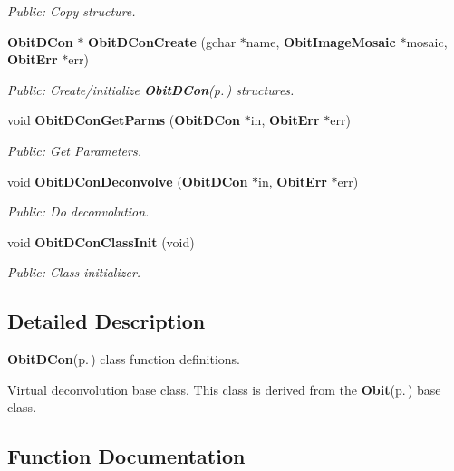 \begin{CompactItemize}
\begin{CompactList}\small\item\em Public: Copy structure. \item\end{CompactList}\item 
{\bf Obit\-DCon} $\ast$ {\bf Obit\-DCon\-Create} (gchar $\ast$name, {\bf Obit\-Image\-Mosaic} $\ast$mosaic, {\bf Obit\-Err} $\ast$err)
\begin{CompactList}\small\item\em Public: Create/initialize {\bf Obit\-DCon}{\rm (p.\,\pageref{structObitDCon})} structures. \item\end{CompactList}\item 
void {\bf Obit\-DCon\-Get\-Parms} ({\bf Obit\-DCon} $\ast$in, {\bf Obit\-Err} $\ast$err)
\begin{CompactList}\small\item\em Public: Get Parameters. \item\end{CompactList}\item 
void {\bf Obit\-DCon\-Deconvolve} ({\bf Obit\-DCon} $\ast$in, {\bf Obit\-Err} $\ast$err)
\begin{CompactList}\small\item\em Public: Do deconvolution. \item\end{CompactList}\item 
void {\bf Obit\-DCon\-Class\-Init} (void)
\begin{CompactList}\small\item\em Public: Class initializer. \item\end{CompactList}\end{CompactItemize}


\subsection{Detailed Description}
{\bf Obit\-DCon}{\rm (p.\,\pageref{structObitDCon})} class function definitions. 

Virtual deconvolution base class. This class is derived from the {\bf Obit}{\rm (p.\,\pageref{structObit})} base class.

\subsection{Function Documentation}
